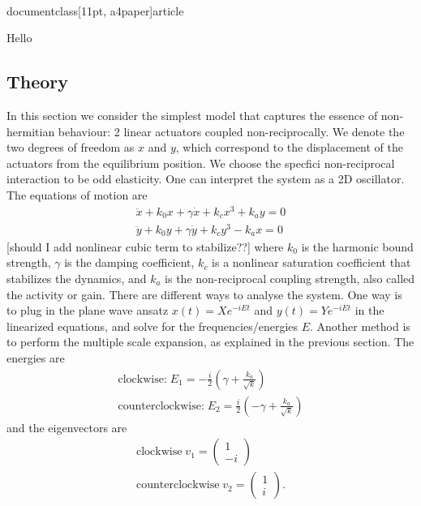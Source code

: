 \\documentclass[11pt, a4paper]{article} %
\newcommand{\xd}{\dot{x}}
\newcommand{\xdd}{\ddot{x}}
\newcommand{\yd}{\dot{y}}
\newcommand{\ydd}{\ddot{y}}
\begin{document}
Hello

\subsection{Theory}
In this section we consider the simplest model that captures the essence of non-hermitian behaviour: 2 linear actuators 
coupled non-reciprocally. We denote the two degrees of freedom as $x$ and $y$, which correspond to the displacement of the 
actuators from the equilibrium position. We choose the specfici non-reciprocal interaction to be odd elasticity. 
One can interpret the system as a 2D oscillator. 
The equations of motion are
    \begin{align}
        \xdd +k_0x +  \gamma \xd + k_cx^3 + k_ay = 0 \label{eq_1osc_x}\\ 
        \ydd +k_0y +  \gamma \yd + k_cy^3 - k_ax = 0 \label{eq_1osc_y}
    \end{align}
[should I add nonlinear cubic term to stabilize??]
where \( k_0 \) is the harmonic bound strength, \( \gamma \) is the damping coefficient, $k_c$ is a nonlinear saturation coefficient 
that stabilizes the dynamics, and \( k_a \) is the non-reciprocal coupling strength, also called the activity or gain. 
There are different ways to analyse the system. One way is to plug in the plane wave ansatz 
\( x(t) = X e^{-iEt} \) and \( y(t) = Y e^{-iEt} \) in the linearized equations, and solve for the frequencies/energies $E$. 
Another method is to perform the multiple scale expansion, as explained in the previous section.
    The energies are 
    \begin{align}
        \text{clockwise:} \; E_1 = -\frac{i}{2}\left(\gamma + \frac{k_a}{\sqrt{k}}\right) \label{eq_1osc_e1}\\
        \text{counterclockwise:} \; E_2 = \frac{i}{2}\left(-\gamma + \frac{k_a}{\sqrt{k}}\right) \label{eq_1osc_e2}
    \end{align}
    and the eigenvectors are 
    \begin{align}
        \text{clockwise} \; v_1 = \begin{pmatrix}
        1 \\ -i
        \end{pmatrix} \label{eq_1osc_v1}\\
        \text{counterclockwise} \; v_2 = \begin{pmatrix}
        1 \\ i
        \end{pmatrix} \label{eq_1osc_v2}.
    \end{align}
\end{document}
